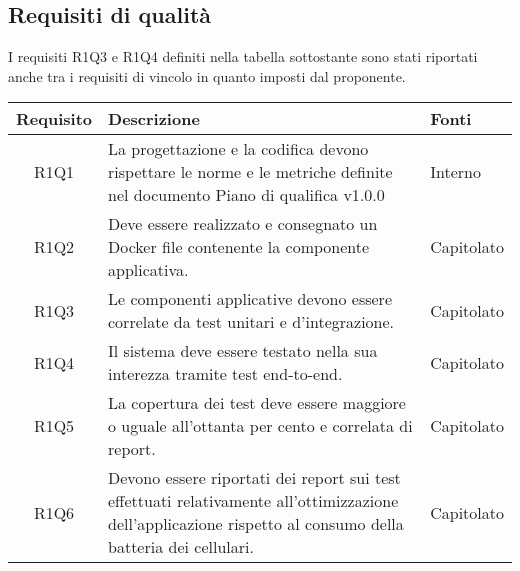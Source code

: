\begin{center}
\begin{longtable}{|c|p{10cm}|p{4cm}|}
	\end{longtable}
\end{center}
\subsection{Requisiti di qualità}
I requisiti R1Q3 e R1Q4 definiti nella tabella sottostante sono stati riportati anche tra i requisiti di vincolo in quanto imposti dal proponente.
\begin{center}
	\begin{longtable}{|c|p{10cm}|p{4cm}|}
		\hline
		\rowcolor{lighter-grayer}
		\textbf{Requisito} & \textbf{Descrizione} & \textbf{Fonti}  \\
		\hline
		\endfirsthead
		
		 R1Q1 &La progettazione e la codifica devono rispettare le norme e le metriche definite nel documento Piano di qualifica v1.0.0 & Interno\\
		\hline	
		R1Q2 &Deve essere realizzato e consegnato un Docker file
		contenente la componente applicativa. & Capitolato\\
		\hline
		R1Q3 &Le componenti applicative devono essere correlate da test unitari e d’integrazione. & Capitolato\\
		\hline
		R1Q4 &Il sistema deve essere testato nella sua interezza tramite test end-to-end. & Capitolato\\
		\hline
		R1Q5 &La copertura dei test deve essere maggiore o uguale all'ottanta per cento e correlata di report. & Capitolato\\
		\hline
		R1Q6 &Devono essere riportati dei report sui test effettuati relativamente all’ottimizzazione dell’applicazione rispetto al consumo della
		batteria dei cellulari. & Capitolato\\
		\hline
		
	\end{longtable}
\end{center}
